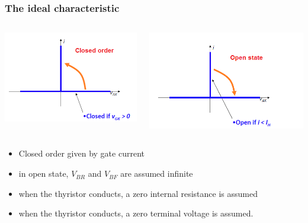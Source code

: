 \begin{frame}
\frametitle{The ideal characteristic}
\begin{columns}
\begin{column}{0.45\linewidth}
\begin{center}
    \includegraphics[width=1.0\linewidth]{images/thyr-id2.png}
\end{center}
\end{column}
\begin{column}{0.45\linewidth}
\begin{center}
    \includegraphics[width=1.0\linewidth]{images/thyr-id1.png}
\end{center}
\end{column}
\end{columns}
\begin{itemize}
    \item Closed order given by gate current
    \item in open state, $V_{BR}$ and $V_{BF}$ are assumed infinite
    \item when the thyristor conducts, a zero internal resistance is assumed
    \item when the thyristor conducts, a zero terminal voltage is assumed.
\end{itemize}
\end{frame}

